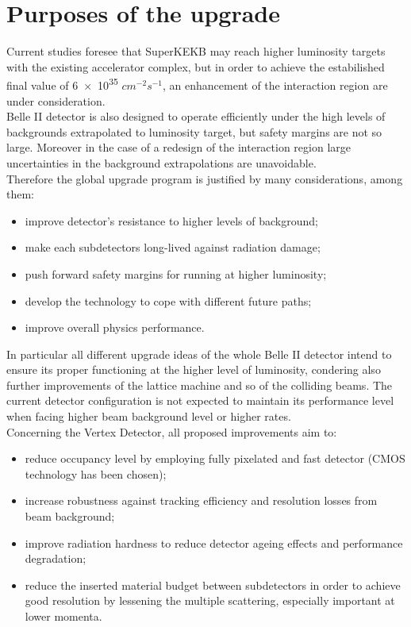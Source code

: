 \section{Purposes of the upgrade}

Current studies foresee that SuperKEKB may reach higher luminosity targets with the existing accelerator complex, but in order to achieve the estabilished final value of  \num{6e35} $cm^{-2} s^{-1}$, an enhancement of the interaction region are under consideration.\\

Belle II detector is also designed to operate efficiently under the high levels of backgrounds extrapolated to luminosity target, but safety margins are not so large. Moreover in the case of a redesign of the interaction region large uncertainties in the background extrapolations are unavoidable. \\
Therefore the global upgrade program is justified by many considerations, among them:

\begin{itemize}
\item improve detector's resistance to higher levels of background;
\item make each subdetectors long-lived against radiation damage;
\item push forward safety margins for running at higher luminosity;
\item develop the technology to cope with different future paths;
\item improve overall physics performance.
\end{itemize}


In particular all different upgrade ideas of the whole Belle II detector intend to ensure its proper functioning at the higher level of luminosity, condering also further improvements of the lattice machine and so of the colliding beams. The current detector configuration is not expected to maintain its performance level when facing higher beam background level or higher rates.\\

Concerning the Vertex Detector, all proposed improvements aim to:

\begin{itemize}
\item reduce occupancy level by employing fully pixelated and fast detector (CMOS technology has been chosen);
\item increase robustness against tracking efficiency and resolution losses from beam background;
\item improve radiation hardness to reduce detector ageing effects and performance degradation;
\item reduce the inserted material budget between subdetectors in order to achieve good resolution by lessening the multiple scattering, especially important at lower momenta.
\end{itemize}


